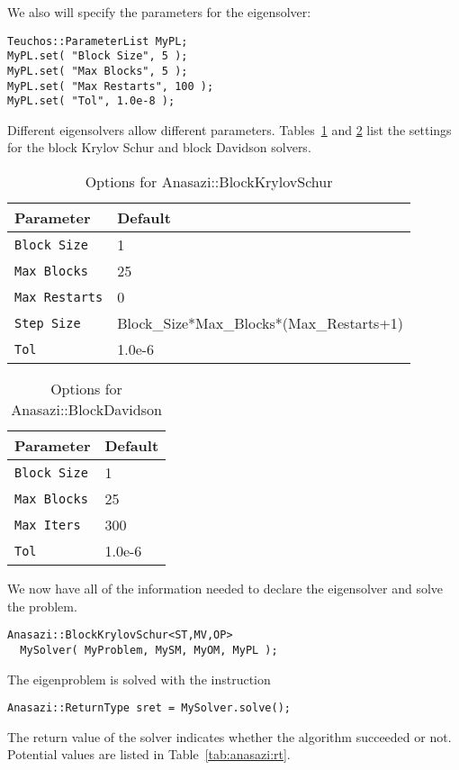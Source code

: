 We also will specify the parameters for the eigensolver:
\begin{verbatim}
Teuchos::ParameterList MyPL;
MyPL.set( "Block Size", 5 );
MyPL.set( "Max Blocks", 5 );
MyPL.set( "Max Restarts", 100 );
MyPL.set( "Tol", 1.0e-8 );
\end{verbatim}
Different eigensolvers allow different parameters.
Tables~\ref{tab:anasazi:bksparams} and \ref{tab:anasazi:bdparams} list
the settings for the block Krylov Schur and block Davidson solvers.


\begin{table}
\begin{center}
\begin{tabular}{| p{4cm} l |}
\hline
Parameter & Default \\
\hline
{\tt Block Size}   & 1      \\
{\tt Max Blocks}   & 25     \\
{\tt Max Restarts} & 0      \\
{\tt Step Size}    & Block\_Size*Max\_Blocks*(Max\_Restarts+1) \\
{\tt Tol}          & 1.0e-6 \\
\hline
\end{tabular}
\caption{Options for Anasazi::BlockKrylovSchur}
\label{tab:anasazi:bksparams}
\end{center}
\end{table}


\begin{table}
\begin{center}
\begin{tabular}{| p{4cm} l |}
\hline
Parameter & Default \\
\hline
{\tt Block Size} & 1      \\
{\tt Max Blocks} & 25     \\
{\tt Max Iters}  & 300    \\
{\tt Tol}        & 1.0e-6 \\
\hline
\end{tabular}
\caption{Options for Anasazi::BlockDavidson}
\label{tab:anasazi:bdparams}
\end{center}
\end{table}

We now have all of the information needed to declare the eigensolver
and solve the problem.
\begin{verbatim}
Anasazi::BlockKrylovSchur<ST,MV,OP> 
  MySolver( MyProblem, MySM, MyOM, MyPL );
\end{verbatim}
The eigenproblem is solved with the instruction
\begin{verbatim}
Anasazi::ReturnType sret = MySolver.solve();
\end{verbatim}
The return value of the solver indicates whether the algorithm
succeeded or not. Potential values are listed in
Table~\ref{tab:anasazi:rt}.

